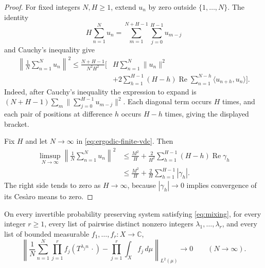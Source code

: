\begin{proof}
For fixed integers \(N,H\geq1\), extend \(u_n\) by zero outside
\(\{1,\ldots,N\}\).  The identity
\[
 H\sum_{n=1}^Nu_n
   =\sum_{m=1}^{N+H-1}\sum_{j=0}^{H-1}u_{m-j}
\]
and Cauchy's inequality give
\begin{equation}
\begin{split}
 \left\|\frac1N\sum_{n=1}^Nu_n\right\|^2
 \leq\frac{N+H-1}{N^2H^2}\bigg[
 &H\sum_{n=1}^N\|u_n\|^2\\
 &+2\sum_{h=1}^{H-1}(H-h)
       \operatorname{Re}\sum_{n=1}^{N-h}
                \langle u_{n+h},u_n\rangle\bigg].
\end{split}
\label{eq:ergodic-finite-vdc}
\end{equation}
Indeed, after Cauchy's inequality the expression to expand is
\((N+H-1)\sum_m\|\sum_{j=0}^{H-1}u_{m-j}\|^2\).  Each diagonal term
occurs \(H\) times, and each pair of positions at difference \(h\)
occurs \(H-h\) times, giving the displayed bracket.

Fix \(H\) and let \(N\to\infty\) in
\eqref{eq:ergodic-finite-vdc}.  Then
\begin{align*}
 \limsup_{N\to\infty}\left\|\frac1N\sum_{n=1}^Nu_n\right\|^2
 &\leq\frac{M^2}{H}
      +\frac2{H^2}\sum_{h=1}^{H-1}(H-h)\operatorname{Re}\gamma_h\\
 &\leq\frac{M^2}{H}+\frac2H\sum_{h=1}^{H-1}|\gamma_h|.
\end{align*}
The right side tends to zero as \(H\to\infty\), because
\(|\gamma_h|\to0\) implies convergence of its Ces\`aro means to zero.
\end{proof}

\begin{lemma}
\label{lem:ergodic-cesaro}
On every invertible probability preserving system satisfying
\eqref{eq:mixing}, for every integer \(r\geq1\), every
list of pairwise distinct nonzero integers
\(\lambda_1,\ldots,\lambda_r\), and every list of bounded measurable
\(f_1,\ldots,f_r:X\to\mathbb C\),
\[
 \left\|
 \frac1N\sum_{n=1}^N\prod_{j=1}^r f_j(T^{\lambda_jn}\,\cdot)
       -\prod_{j=1}^r\int_Xf_j\,d\mu
 \right\|_{L^2(\mu)}
 \longrightarrow0\qquad(N\to\infty).
\]
\end{lemma}

